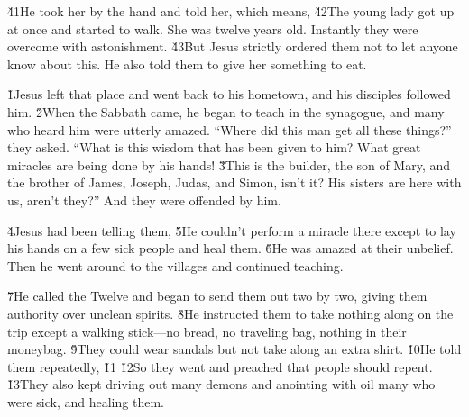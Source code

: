 \v{41}He took her by the hand and told her,  which means,  \v{42}The young lady got up at once and started to walk. She was twelve years old. Instantly they were overcome with astonishment. \v{43}But Jesus strictly ordered them not to let anyone know about this. He also told them to give her something to eat.

\v{1}Jesus left that place and went back to his hometown, and his disciples followed him. \v{2}When the Sabbath came, he began to teach in the synagogue, and many who heard him were utterly amazed. ``Where did this man get all these things?'' they asked. ``What is this wisdom that has been given to him? What great miracles are being done by his hands! \v{3}This is the builder, the son of Mary, and the brother of James, Joseph, Judas, and Simon, isn't it? His sisters are here with us, aren't they?'' And they were offended by him.

\v{4}Jesus had been telling them,  \v{5}He couldn't perform a miracle there except to lay his hands on a few sick people and heal them. \v{6}He was amazed at their unbelief. Then he went around to the villages and continued teaching.

\v{7}He called the Twelve and began to send them out two by two, giving them authority over unclean spirits. \v{8}He instructed them to take nothing along on the trip except a walking stick---no bread, no traveling bag, nothing in their moneybag. \v{9}They could wear sandals but not take along an extra shirt. \v{10}He told them repeatedly,  \v{11}   \v{12}So they went and preached that people should repent. \v{13}They also kept driving out many demons and anointing with oil many who were sick, and healing them.

